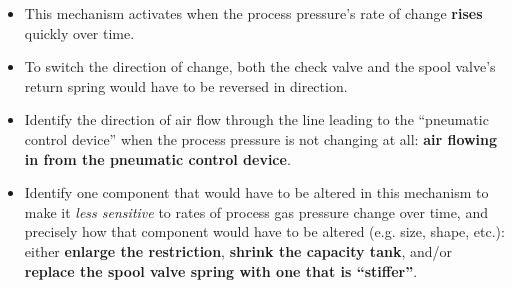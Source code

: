 \vfil 

\eject






\begin{itemize}
\item{} This mechanism activates when the process pressure's rate of change {\bf rises} quickly over time.
\vskip 10pt 
\item{} To switch the direction of change, both the check valve and the spool valve's return spring would have to be reversed in direction.
\vskip 10pt 
\item{} Identify the direction of air flow through the line leading to the ``pneumatic control device'' when the process pressure is not changing at all: {\bf air flowing in from the pneumatic control device}.
\vskip 10pt 
\item{} Identify one component that would have to be altered in this mechanism to make it {\it less sensitive} to rates of process gas pressure change over time, and precisely how that component would have to be altered (e.g. size, shape, etc.): either {\bf enlarge the restriction}, {\bf shrink the capacity tank}, and/or {\bf replace the spool valve spring with one that is ``stiffer''}.
\end{itemize}












